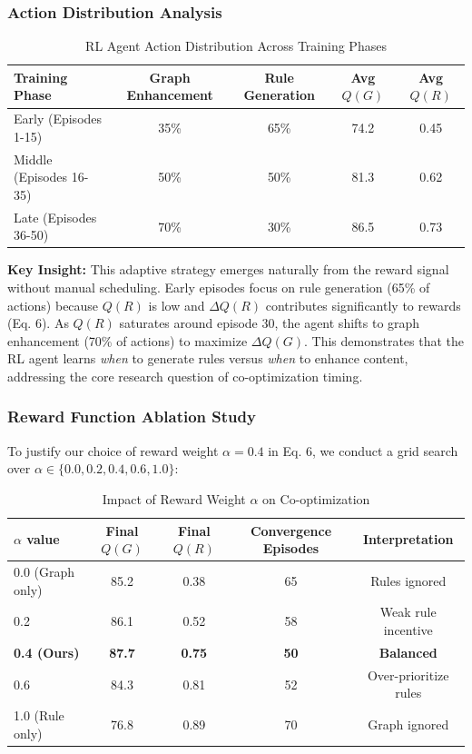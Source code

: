 \documentclass[runningheads]{llncs}
\begin{document}
\subsubsection{Action Distribution Analysis}

\begin{table}[H]
    \centering
    \caption{RL Agent Action Distribution Across Training Phases}
    \label{tab:action_distribution}
    \begin{tabular}{l c c c c}
    \toprule
    Training Phase & Graph Enhancement & Rule Generation & Avg $Q(G)$ & Avg $Q(R)$ \\
    \midrule
    Early (Episodes 1-15) & 35\% & 65\% & 74.2 & 0.45 \\
    Middle (Episodes 16-35) & 50\% & 50\% & 81.3 & 0.62 \\
    Late (Episodes 36-50) & 70\% & 30\% & 86.5 & 0.73 \\
    \bottomrule
    \end{tabular}
\end{table}

\textbf{Key Insight:} This adaptive strategy emerges naturally from the reward signal without manual scheduling. Early episodes focus on rule generation (65\% of actions) because $Q(R)$ is low and $\Delta Q(R)$ contributes significantly to rewards (Eq. 6). As $Q(R)$ saturates around episode 30, the agent shifts to graph enhancement (70\% of actions) to maximize $\Delta Q(G)$. This demonstrates that the RL agent learns \textit{when} to generate rules versus \textit{when} to enhance content, addressing the core research question of co-optimization timing.

\subsubsection{Reward Function Ablation Study}

To justify our choice of reward weight $\alpha=0.4$ in Eq. 6, we conduct a grid search over $\alpha \in \{0.0, 0.2, 0.4, 0.6, 1.0\}$:

\begin{table}[H]
    \centering
    \caption{Impact of Reward Weight $\alpha$ on Co-optimization}
    \label{tab:reward_ablation}
    \begin{tabular}{l c c c c}
    \toprule
    $\alpha$ value & Final $Q(G)$ & Final $Q(R)$ & Convergence Episodes & Interpretation \\
    \midrule
    0.0 (Graph only) & 85.2 & 0.38 & 65 & Rules ignored \\
    0.2 & 86.1 & 0.52 & 58 & Weak rule incentive \\
    \textbf{0.4 (Ours)} & \textbf{87.7} & \textbf{0.75} & \textbf{50} & \textbf{Balanced} \\
    0.6 & 84.3 & 0.81 & 52 & Over-prioritize rules \\
    1.0 (Rule only) & 76.8 & 0.89 & 70 & Graph ignored \\
    \bottomrule
    \end{tabular}
\end{table}
\end{document}
